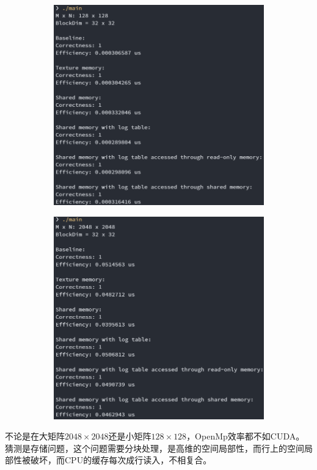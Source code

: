 \documentclass[UTF8, a4paper, 11pt]{article}
\begin{document}
\begin{figure}[H]
\begin{center}
\begin{subfigure}[b]{0.48\linewidth}
    \includegraphics[width=\textwidth]{cuda128.png}
\end{subfigure}
\begin{subfigure}[b]{0.48\linewidth}
    \includegraphics[width=\textwidth]{cuda2048.png}
\end{subfigure}
\end{center}
\end{figure}
不论是在大矩阵$2048\times2048$还是小矩阵$128\times128$，OpenMp效率都不如CUDA。
猜测是存储问题，这个问题需要分块处理，是高维的空间局部性，而行上的空间局部性被破坏，而CPU的缓存每次成行读入，不相复合。
%
%
\end{document}
